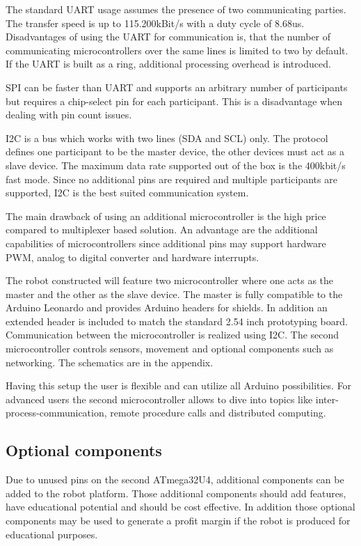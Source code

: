 \documentclass[11pt,a4paper]{article}
\begin{document}
The standard UART usage assumes the presence of two communicating parties. The transfer speed is up to 115.200kBit/s with a duty cycle of 8.68us. Disadvantages of using the UART for communication is, that the number of communicating microcontrollers over the same lines is limited to two by default. If the UART is built as a ring, additional processing overhead is introduced. 

SPI can be faster than UART and supports an arbitrary number of participants but requires a chip-select pin for each participant. This is a disadvantage when dealing with pin count issues.

I2C is a bus which works with two lines (SDA and SCL) only. The protocol defines one participant to be the master device, the other devices must act as a slave device. The maximum data rate supported out of the box is the 400kbit/s fast mode. Since no additional pins are required and multiple participants are supported, I2C is the best suited communication system.

The main drawback of using an additional microcontroller is the high price compared to multiplexer based solution. An advantage are the additional capabilities of microcontrollers since additional pins may support hardware PWM, analog to digital converter and hardware interrupts.  

The robot constructed will feature two microcontroller where one acts as the master and the other as the slave device. The master is fully compatible to the Arduino Leonardo and provides Arduino headers for shields. In addition an extended header is included to match the standard 2.54 inch prototyping board. Communication between the microcontroller is realized using I2C. The second microcontroller controls sensors, movement and optional components such as networking. The schematics are in the appendix.

Having this setup the user is flexible and can utilize all Arduino possibilities. For advanced users the second microcontroller allows to dive into topics like inter-process-communication, remote procedure calls and distributed computing. 

\subsection{Optional components}
Due to unused pins on the second ATmega32U4, additional components can be added to the robot platform. Those additional components should add features, have educational potential and should be cost effective. In addition those optional components may be used to generate a profit margin if the robot is produced for educational purposes.
\end{document}
